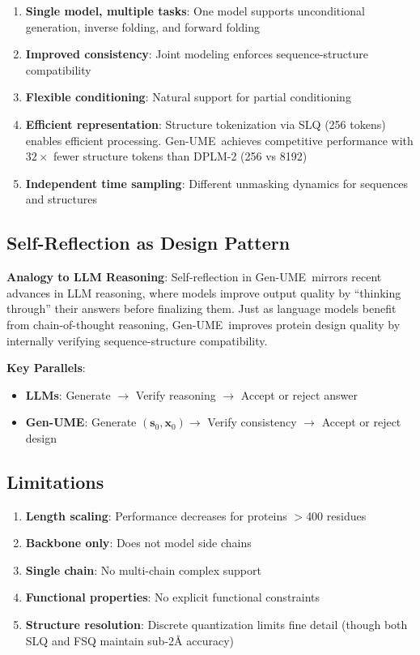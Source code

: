 \documentclass[11pt,a4paper]{article}
\newcommand{\genume}{Gen-UME}
\begin{document}
\begin{enumerate}
\item \textbf{Single model, multiple tasks}: One model supports unconditional generation, inverse folding, and forward folding
\item \textbf{Improved consistency}: Joint modeling enforces sequence-structure compatibility
\item \textbf{Flexible conditioning}: Natural support for partial conditioning
\item \textbf{Efficient representation}: Structure tokenization via SLQ (256 tokens) enables efficient processing. \genume~achieves competitive performance with $32\times$ fewer structure tokens than DPLM-2 (256 vs 8192)
\item \textbf{Independent time sampling}: Different unmasking dynamics for sequences and structures
\end{enumerate}

\subsection{Self-Reflection as Design Pattern}

\textbf{Analogy to LLM Reasoning}: Self-reflection in \genume~mirrors recent advances in LLM reasoning, where models improve output quality by ``thinking through'' their answers before finalizing them. Just as language models benefit from chain-of-thought reasoning, \genume~improves protein design quality by internally verifying sequence-structure compatibility.

\textbf{Key Parallels}:
\begin{itemize}
\item \textbf{LLMs}: Generate $\rightarrow$ Verify reasoning $\rightarrow$ Accept or reject answer
\item \textbf{\genume}: Generate $(\mathbf{s}_0, \mathbf{x}_0) \rightarrow$ Verify consistency $\rightarrow$ Accept or reject design
\end{itemize}

\subsection{Limitations}

\begin{enumerate}
\item \textbf{Length scaling}: Performance decreases for proteins $>$400 residues
\item \textbf{Backbone only}: Does not model side chains
\item \textbf{Single chain}: No multi-chain complex support
\item \textbf{Functional properties}: No explicit functional constraints
\item \textbf{Structure resolution}: Discrete quantization limits fine detail (though both SLQ and FSQ maintain sub-2Å accuracy)
\end{enumerate}
\end{document}

